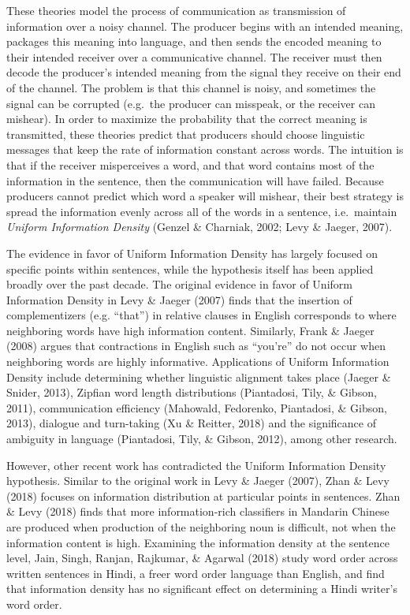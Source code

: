 \documentclass[10pt, letterpaper]{article}
\begin{document}
These theories model the process of communication as transmission of
information over a noisy channel. The producer begins with an intended
meaning, packages this meaning into language, and then sends the encoded
meaning to their intended receiver over a communicative channel. The
receiver must then decode the producer's intended meaning from the
signal they receive on their end of the channel. The problem is that
this channel is noisy, and sometimes the signal can be corrupted
(e.g.~the producer can misspeak, or the receiver can mishear). In order
to maximize the probability that the correct meaning is transmitted,
these theories predict that producers should choose linguistic messages
that keep the rate of information constant across words. The intuition
is that if the receiver misperceives a word, and that word contains most
of the information in the sentence, then the communication will have
failed. Because producers cannot predict which word a speaker will
mishear, their best strategy is spread the information evenly across all
of the words in a sentence, i.e.~maintain \emph{Uniform Information
Density} (Genzel \& Charniak, 2002; Levy \& Jaeger, 2007).

The evidence in favor of Uniform Information Density has largely focused
on specific points within sentences, while the hypothesis itself has
been applied broadly over the past decade. The original evidence in
favor of Uniform Information Density in Levy \& Jaeger (2007) finds that
the insertion of complementizers (e.g. ``that'') in relative clauses in
English corresponds to where neighboring words have high information
content. Similarly, Frank \& Jaeger (2008) argues that contractions in
English such as ``you're'' do not occur when neighboring words are
highly informative. Applications of Uniform Information Density include
determining whether linguistic alignment takes place (Jaeger \& Snider,
2013), Zipfian word length distributions (Piantadosi, Tily, \& Gibson,
2011), communication efficiency (Mahowald, Fedorenko, Piantadosi, \&
Gibson, 2013), dialogue and turn-taking (Xu \& Reitter, 2018) and the
significance of ambiguity in language (Piantadosi, Tily, \& Gibson,
2012), among other research.

However, other recent work has contradicted the Uniform Information
Density hypothesis. Similar to the original work in Levy \& Jaeger
(2007), Zhan \& Levy (2018) focuses on information distribution at
particular points in sentences. Zhan \& Levy (2018) finds that more
information-rich classifiers in Mandarin Chinese are produced when
production of the neighboring noun is difficult, not when the
information content is high. Examining the information density at the
sentence level, Jain, Singh, Ranjan, Rajkumar, \& Agarwal (2018) study
word order across written sentences in Hindi, a freer word order
language than English, and find that information density has no
significant effect on determining a Hindi writer's word order.
\end{document}
